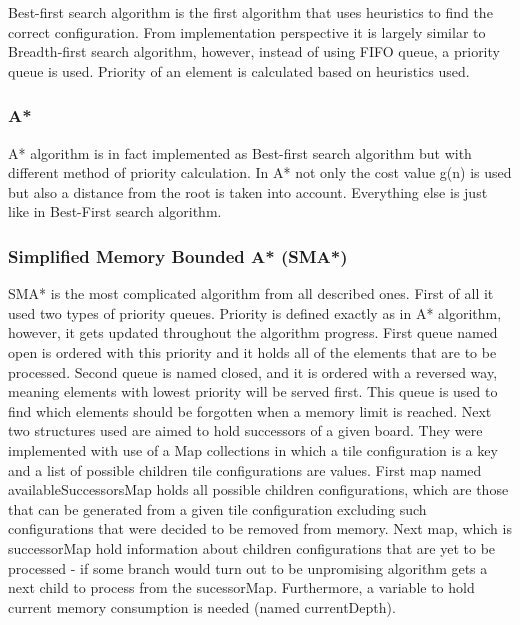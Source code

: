 \documentclass[12pt]{article}
\begin{document}
Best-first search algorithm is the first algorithm that uses heuristics to find the correct configuration. From implementation perspective it is largely similar to Breadth-first search algorithm, however, instead of using FIFO queue, a priority queue is used. Priority of an element is calculated based on heuristics used.

\subsubsection{A*}

A* algorithm is in fact implemented as Best-first search algorithm but with different method of priority calculation. In A* not only the cost value g(n) is used but also a distance from the root is taken into account. Everything else is just like in Best-First search algorithm.


\subsubsection{Simplified Memory Bounded A* (SMA*)}

SMA* is the most complicated algorithm from all described ones. First of all it used two types of priority queues. Priority is defined exactly as in A* algorithm, however, it gets updated throughout the algorithm progress. First queue named open is ordered with this priority and it holds all of the elements that are to be processed. Second queue is named closed, and it is ordered with a reversed way, meaning elements with lowest priority will be served first. This queue is used to find which elements should be forgotten when a memory limit is reached. Next two structures used are aimed to hold successors of a given board. They were implemented with use of a Map collections in which a tile configuration is a key and a list of possible children tile configurations are values. First map named availableSuccessorsMap holds all possible children configurations, which are those that can be generated from a given tile configuration excluding such configurations that were decided to be removed from memory. Next map, which is successorMap hold information about children configurations that are yet to be processed - if some branch would turn out to be unpromising algorithm gets a next child to process from the sucessorMap. Furthermore, a variable to hold current memory consumption is needed (named currentDepth). 
\end{document}
